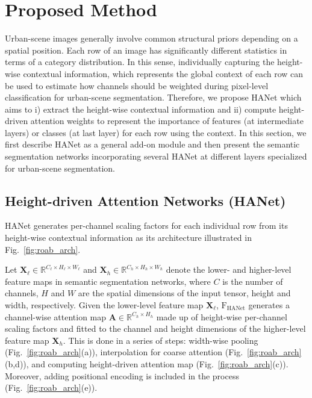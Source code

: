 \documentclass[10pt,twocolumn,letterpaper]{article}
\begin{document}
\vspace*{-0.1cm}
\section{Proposed Method}
\vspace*{-0.1cm}
Urban-scene images generally involve common structural priors depending on a spatial position. Each row of an image has significantly different statistics in terms of a category distribution. In this sense, individually capturing the height-wise contextual information, which represents the global context of each row can be used to estimate how channels should be weighted during pixel-level classification for urban-scene segmentation. Therefore, we propose HANet
which aims to i) extract the height-wise contextual information and ii) compute height-driven attention weights to represent the importance of features (at intermediate layers) or classes (at last layer) for each row using the context.
In this section, we first describe HANet as 
a general add-on module and then present the semantic segmentation networks incorporating several HANet at different layers specialized for urban-scene segmentation.

\vspace*{-0.1cm}
\subsection{Height-driven Attention Networks (HANet)}\label{sec:method_block}
\vspace*{-0.1cm}
HANet generates per-channel scaling factors for each individual row from its height-wise contextual information as 
its architecture illustrated in Fig.~\ref{fig:roab_arch}.

Let $\mathbf{X}_\ell\in\mathbb{R}^{C_\ell\times H_\ell\times W_\ell}$ and $\mathbf{X}_h\in\mathbb{R}^{C_h\times H_h\times W_h}$ denote the lower- and higher-level feature maps in semantic segmentation networks, where $C$ is the number of channels, $H$ and $W$ are the spatial dimensions of the input tensor, height and width, respectively. Given the lower-level feature map $\mathbf{X}_\ell$, $\text{F}_{\text{HANet}}$ generates a channel-wise attention map $\mathbf{A}\in\mathbb{R}^{C_h\times H_h}$ made up of height-wise per-channel scaling factors and fitted to the channel and height dimensions of the higher-level feature map $\mathbf{X}_h$. This is done in a series of steps: width-wise pooling (Fig.~\ref{fig:roab_arch}(a)), interpolation for coarse attention (Fig.~\ref{fig:roab_arch}(b,d)), and computing height-driven attention map (Fig.~\ref{fig:roab_arch}(c)). Moreover, adding positional encoding is included in the process (Fig.~\ref{fig:roab_arch}(e)).
\end{document}
